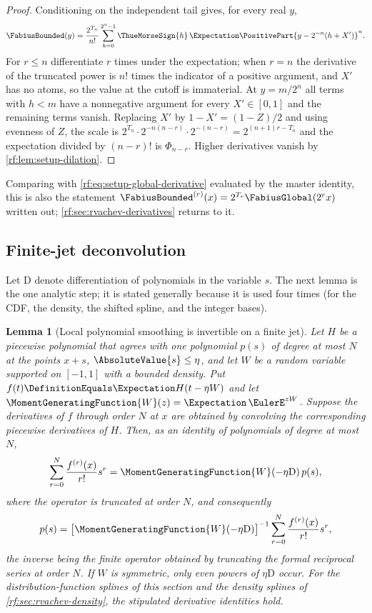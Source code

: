 \documentclass[11pt,oneside]{article}
\theoremstyle{plain}
\newtheorem{lemma}[theorem]{Lemma}
\theoremstyle{definition}
\theoremstyle{remark}
\newcommand{\Fb}{\FabiusBounded}            %
\newcommand{\Fg}{\FabiusGlobal}             %
\newcommand{\tm}[1]{\ThueMorseSign{#1}}     %
\newcommand{\E}{\Expectation}
\newcommand{\Tr}[1]{T_{#1}}                 %
\newcommand{\Dop}{\mathrm{D}}               %
\begin{document}
\begin{proof}
Conditioning on the independent tail gives, for every real $y$,
\[
 \Fb(y)=\frac{2^{\Tr{n}}}{n!}\sum_{h=0}^{2^{n}-1}\tm{h}\,
 \E\PositivePart{y-2^{-n}(h+X')}^{n}.
\]
For $r\le n$ differentiate $r$ times under the expectation; when $r=n$ the
derivative of the truncated power is $n!$ times the indicator of a positive
argument, and $X'$ has no atoms, so the value at the cutoff is immaterial.
At $y=m/2^{n}$ all terms with $h<m$ have a nonnegative argument for every
$X'\in[0,1]$ and the remaining terms vanish.  Replacing $X'$ by
$1-X'=(1-Z)/2$ and using evenness of $Z$, the scale is
$2^{\Tr{n}}\cdot2^{-n(n-r)}\cdot2^{-(n-r)}=2^{(n+1)r-\Tr{n}}$ and the
expectation divided by $(n-r)!$ is $\Phi_{n-r}$.  Higher derivatives vanish
by \cref{rf:lem:setup-dilation}.
\end{proof}

Comparing with \cref{rf:eq:setup-global-derivative} evaluated by the master
identity, this is also the statement $\Fb^{(r)}(x)=2^{\Tr{r}}\Fg(2^{r}x)$
written out; \cref{rf:sec:rvachev-derivatives} returns to it.

\subsection{Finite-jet deconvolution}
\label{rf:sec:splines-deconvolution}

Let $\Dop$ denote differentiation of polynomials in the variable $s$.  The
next lemma is the one analytic step; it is stated generally because it is
used four times (for the CDF, the density, the shifted spline, and the
integer bases).

\begin{lemma}[Local polynomial smoothing is invertible on a finite jet]
\label{rf:lem:splines-local-inverse}
Let $H$ be a piecewise polynomial that agrees with one polynomial $p(s)$ of
degree at most $N$ at the points $x+s$, $\AbsoluteValue{s}\le\eta$, and let
$W$ be a random variable supported on $[-1,1]$ with a bounded density.  Put
$f(t)\DefinitionEquals\E H(t-\eta W)$ and let
$\MomentGeneratingFunction{W}(z)=\E\,\EulerE^{zW}$.  Suppose the derivatives
of $f$ through order $N$ at $x$ are obtained by convolving the
corresponding piecewise derivatives of $H$.  Then, as an identity of
polynomials of degree at most $N$,
\begin{equation}
 \sum_{r=0}^{N}\frac{f^{(r)}(x)}{r!}s^{r}=\MomentGeneratingFunction{W}(-\eta\Dop)\,p(s),
 \label{rf:eq:splines-jet-operator}
\end{equation}
where the operator is truncated at order $N$, and consequently
\begin{equation}
 p(s)=\bigl[\MomentGeneratingFunction{W}(-\eta\Dop)\bigr]^{-1}
 \sum_{r=0}^{N}\frac{f^{(r)}(x)}{r!}s^{r},
 \label{rf:eq:splines-local-inverse}
\end{equation}
the inverse being the finite operator obtained by truncating the formal
reciprocal series at order $N$.  If $W$ is symmetric, only even powers of
$\eta\Dop$ occur.  For the distribution-function splines of this section and
the density splines of \cref{rf:sec:rvachev-density}, the stipulated
derivative identities hold.
\end{lemma}
\end{document}

